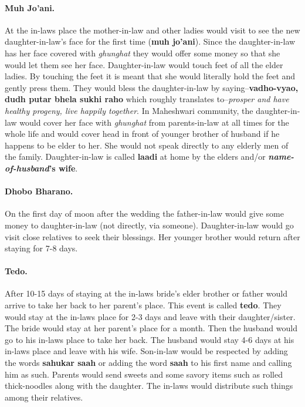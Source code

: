 \paragraph{Muh Jo'ani.} At the in-laws place the mother-in-law and other ladies
would visit to see the new daughter-in-law's face for the first time
(\textbf{muh jo'ani}). Since the daughter-in-law has her face covered with
\textit{ghunghat} they would offer some money so that she would let them see
her face. Daughter-in-law would touch feet of all the elder ladies. By touching
the feet it is meant that she would literally hold the feet and gently press
them. They would bless the daughter-in-law by saying--\textbf{vadho-vyao, dudh
putar bhela sukhi raho} which roughly translates to--\textit{prosper and
have healthy progeny, live happily together}. In Maheshwari community,
the daughter-in-law would cover her face with \textit{ghunghat} from
parents-in-law at all times for the whole life and would cover head in
front of younger brother of husband if he happens to be elder to her.
She would not speak directly to any elderly men of the family.
Daughter-in-law is called \textbf{laadi} at home by the elders and/or
\textbf{\emph{name-of-husband}'s wife}. 

\paragraph{Dhobo Bharano.} On the first day of moon after the wedding the
father-in-law would give some money to daughter-in-law (not directly, via
someone). Daughter-in-law would go visit close relatives to seek their
blessings. Her younger brother would return after staying for 7-8 days.

\paragraph{Tedo.} After 10-15 days of staying at the in-laws bride's elder
brother or father would arrive to take her back to her parent's place. This
event is called \textbf{tedo}. They would stay at the in-laws place for 2-3
days and leave with their daughter/sister. The bride would stay at her parent's
place for a month. Then the husband would go to his in-laws place to take her
back. The husband would stay 4-6 days at his in-laws place and leave with his
wife. Son-in-law would be respected by adding the words \textbf{sahukar saah}
or adding the word \textbf{saah} to his first name and calling him as such.
Parents would send sweets and some savory items such as rolled thick-noodles
along with the daughter. The in-laws would distribute such things among their
relatives. 

